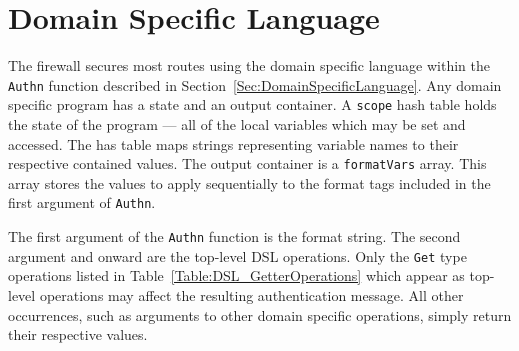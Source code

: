 


\section{Domain Specific Language}

The firewall secures most routes using the domain specific language within the \lstinline{Authn} function described in Section~\ref{Sec:DomainSpecificLanguage}. Any domain specific program has a state and an output container. A \lstinline{scope} hash table holds the state of the program --- all of the local variables which may be set and accessed. The has table maps strings representing variable names to their respective contained values. The output container is a \lstinline{formatVars} array. This array stores the values to apply sequentially to the format tags included in the first argument of \lstinline{Authn}.



The first argument of the \lstinline{Authn} function is the format string. The second argument and onward are the top-level DSL operations. Only the \lstinline{Get} type operations listed in Table~\ref{Table:DSL_GetterOperations} which appear as top-level operations may affect the resulting authentication message. All other occurrences, such as arguments to other domain specific operations, simply return their respective values. 

